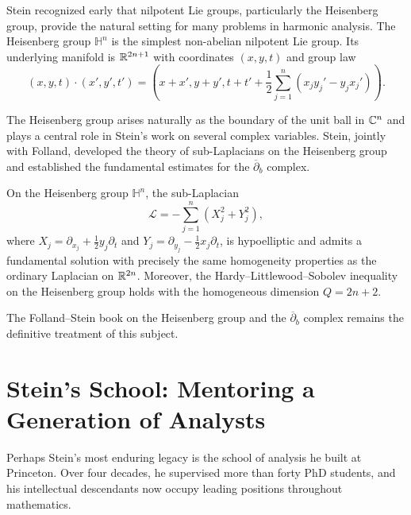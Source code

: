 Stein recognized early that nilpotent Lie groups, particularly the Heisenberg group, provide the natural setting for many problems in harmonic analysis. The Heisenberg group \(\mathbb{H}^n\) is the simplest non-abelian nilpotent Lie group. Its underlying manifold is \(\mathbb{R}^{2n+1}\) with coordinates \((x,y,t)\) and group law
\[
(x,y,t)\cdot(x',y',t') = \left(x+x', y+y', t+t' + \frac12\sum_{j=1}^n (x_j y_j' - y_j x_j')\right).
\]

The Heisenberg group arises naturally as the boundary of the unit ball in \(\mathbb{C}^n\) and plays a central role in Stein's work on several complex variables. Stein, jointly with Folland, developed the theory of sub-Laplacians on the Heisenberg group and established the fundamental estimates for the \(\overline{\partial}_b\) complex.

\begin{theorem}
On the Heisenberg group \(\mathbb{H}^n\), the sub-Laplacian
\[
\mathcal{L} = -\sum_{j=1}^n (X_j^2 + Y_j^2),
\]
where \(X_j = \partial_{x_j} + \frac12 y_j \partial_t\) and \(Y_j = \partial_{y_j} - \frac12 x_j \partial_t\), is hypoelliptic and admits a fundamental solution with precisely the same homogeneity properties as the ordinary Laplacian on \(\mathbb{R}^{2n}\). Moreover, the Hardy--Littlewood--Sobolev inequality on the Heisenberg group holds with the homogeneous dimension \(Q = 2n+2\).
\end{theorem}

The Folland--Stein book on the Heisenberg group and the \(\overline{\partial}_b\) complex remains the definitive treatment of this subject.

\section{Stein's School: Mentoring a Generation of Analysts}

Perhaps Stein's most enduring legacy is the school of analysis he built at Princeton. Over four decades, he supervised more than forty PhD students, and his intellectual descendants now occupy leading positions throughout mathematics.

